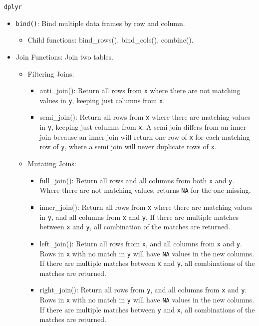 \documentclass[
]{book}
\providecommand{\tightlist}{%
  \setlength{\itemsep}{0pt}\setlength{\parskip}{0pt}}
\begin{document}
\texttt{dplyr}

\begin{itemize}
\tightlist
\item
  \texttt{bind()}: Bind multiple data frames by row and column.

  \begin{itemize}
  \tightlist
  \item
    Child functions: bind\_rows(), bind\_cols(), combine().
  \end{itemize}
\item
  Join Functions: Join two tables.

  \begin{itemize}
  \tightlist
  \item
    Filtering Joins:

    \begin{itemize}
    \tightlist
    \item
      anti\_join(): Return all rows from \texttt{x} where there are not matching values in \texttt{y}, keeping just columns from \texttt{x}.
    \item
      semi\_join(): Return all rows from \texttt{x} where there are matching values in \texttt{y}, keeping just columns from \texttt{x}. A semi join differs from an inner join because an inner join will return one row of \texttt{x} for each matching row of \texttt{y}, where a semi join will never duplicate rows of \texttt{x}.
    \end{itemize}
  \item
    Mutating Joins:

    \begin{itemize}
    \tightlist
    \item
      full\_join(): Return all rows and all columns from both \texttt{x} and \texttt{y}. Where there are not matching values, returns \texttt{NA} for the one missing.
    \item
      inner\_join(): Return all rows from \texttt{x} where there are matching values in \texttt{y}, and all columns from \texttt{x} and \texttt{y}. If there are multiple matches between \texttt{x} and \texttt{y}, all combination of the matches are returned.
    \item
      left\_join(): Return all rows from \texttt{x}, and all columns from \texttt{x} and \texttt{y}. Rows in \texttt{x} with no match in \texttt{y} will have \texttt{NA} values in the new columns. If there are multiple matches between \texttt{x} and \texttt{y}, all combinations of the matches are returned.
    \item
      right\_join(): Return all rows from \texttt{y}, and all columns from \texttt{x} and \texttt{y}. Rows in \texttt{x} with no match in \texttt{y} will have \texttt{NA} values in the new columns. If there are multiple matches between \texttt{y} and \texttt{x}, all combinations of the matches are returned.
    \end{itemize}
  \end{itemize}
\end{itemize}
\end{document}
